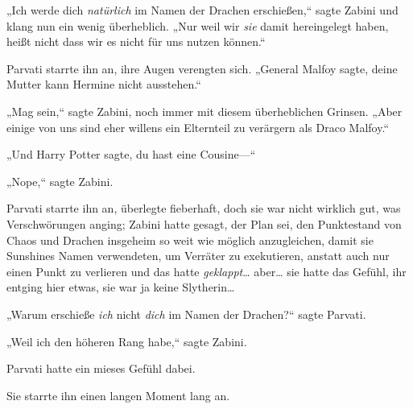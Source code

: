 „Ich werde dich \emph{natürlich} im Namen der Drachen erschießen,“ sagte Zabini und klang nun ein wenig überheblich. „Nur weil wir \emph{sie} damit hereingelegt haben, heißt nicht dass wir es nicht für uns nutzen können.“

Parvati starrte ihn an, ihre Augen verengten sich. „General Malfoy sagte, deine Mutter kann Hermine nicht ausstehen.“

„Mag sein,“ sagte Zabini, noch immer mit diesem überheblichen Grinsen. „Aber einige von uns sind eher willens ein Elternteil zu verärgern als Draco Malfoy.“

„Und Harry Potter sagte, du hast eine Cousine—“

„Nope,“ sagte Zabini.

Parvati starrte ihn an, überlegte fieberhaft, doch sie war nicht wirklich gut, was Verschwörungen anging; Zabini hatte gesagt, der Plan sei, den Punktestand von Chaos und Drachen insgeheim so weit wie möglich anzugleichen, damit sie Sunshines Namen verwendeten, um Verräter zu exekutieren, anstatt auch nur einen Punkt zu verlieren und das hatte \emph{geklappt}… aber… sie hatte das Gefühl, ihr entging hier etwas, sie war ja keine Slytherin…

„Warum erschieße \emph{ich} nicht \emph{dich} im Namen der Drachen?“ sagte Parvati.

„Weil ich den höheren Rang habe,“ sagte Zabini.

Parvati hatte ein mieses Gefühl dabei.

Sie starrte ihn einen langen Moment lang an.

